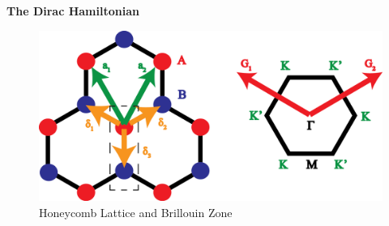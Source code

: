 \documentclass[a4paper,12pt]{article}
\begin{document}
\textbf{The Dirac Hamiltonian} \\

\begin{figure}[h!]
\centering
\includegraphics[width=120mm,keepaspectratio=true]{honeycomb_primitive_cell.png}
\caption{Honeycomb Lattice and Brillouin Zone}\label{Honeycomb}
\end{figure}
\end{document}
